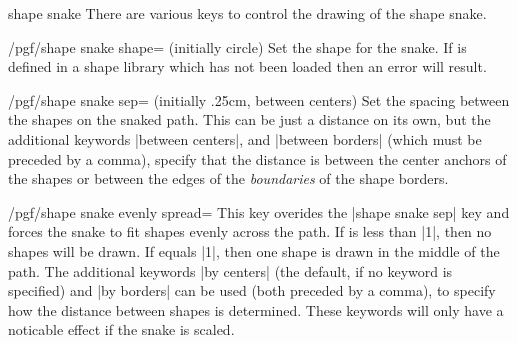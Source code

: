 \begin{snake}{shape snake}
  There are various keys to control the drawing of the shape snake.

\begin{key}{/pgf/shape snake shape= (initially circle)}
  Set the shape for the snake. If  is defined in a shape
  library which has not been loaded then an error will result.
\end{key}

\begin{key}{/pgf/shape snake sep= (initially {.25cm, between centers})}
  Set the spacing between the shapes on the snaked path. This can be
  just a distance on its own, but the additional keywords 
  |between centers|, and |between borders| (which must be preceded by a 
  comma), specify that the distance	is between the center anchors of 
  the shapes or between the edges of the \emph{boundaries} of
  the shape borders.
	
\begin{codeexample}[]
\end{codeexample}

\end{key}


  
\begin{key}{/pgf/shape snake evenly spread=}
  This key overides the |shape snake sep| key and forces the snake to
  fit  shapes evenly across the path. 
  If  is less than |1|, then no shapes will be drawn. 
  If  equals |1|, then one shape is drawn in the middle 
  of the path. 
  The additional keywords |by centers| (the default, if no keyword is
  specified) and |by borders| can be used (both preceded by a comma), 
  to specify how the distance between shapes is determined. These
  keywords will only have a noticable effect if the snake is scaled.
  

\end{key}
\end{snake}
